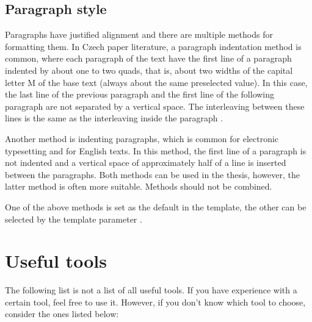 \subsection{Paragraph style}

Paragraphs have justified alignment and there are multiple methods for formatting them. In Czech paper literature, a paragraph indentation method is common, where each paragraph of the text have the first line of a paragraph indented by about one to two quads, that is, about two widths of the capital letter M of the base text (always about the same preselected value). In this case, the last line of the previous paragraph and the first line of the following paragraph are not separated by a vertical space. The interleaving between these lines is the same as the interleaving inside the paragraph \cite{fitWeb}.

Another method is indenting paragraphs, which is common for electronic typesetting and for English texts. In this method, the first line of a paragraph is not indented and a vertical space of approximately half of a line is inserted between the paragraphs. Both methods can be used in the thesis, however, the latter method is often more suitable. Methods should not be combined.

One of the above methods is set as the default in the template, the other can be selected by the template parameter .


\section{Useful tools} 
\label{nastroje}

The following list is not a list of all useful tools. If you have experience with a certain tool, feel free to use it. However, if you don't know which tool to choose, consider the ones listed below:

